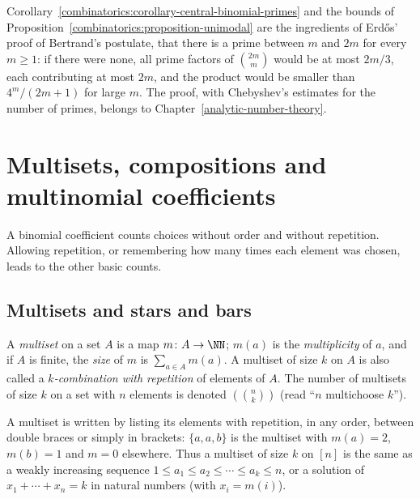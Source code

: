 \begin{remark}\label{combinatorics:remark-bertrand}
Corollary~\ref{combinatorics:corollary-central-binomial-primes} and the bounds of Proposition~\ref{combinatorics:proposition-unimodal} are the ingredients of Erd\H{o}s' proof of Bertrand's postulate,
that there is a prime between $m$ and $2m$ for every $m \geq 1$: if there were none, all prime factors of $\binom{2m}{m}$ would be at most $2m/3$, each contributing at most $2m$, and the product would
be smaller than $4^m/(2m + 1)$ for large $m$. The proof, with Chebyshev's estimates for the number of primes, belongs to Chapter~\ref{analytic-number-theory}.
\end{remark}

\section{Multisets, compositions and multinomial coefficients}\label{combinatorics:section-multisets}

A binomial coefficient counts choices without order and without repetition. Allowing repetition, or remembering how many times each element was chosen, leads to the other basic counts.

\subsection{Multisets and stars and bars}\label{combinatorics:subsection-stars-bars}

\begin{definition}\label{combinatorics:definition-multiset}
A \emph{multiset} on a set $A$ is a map $m \colon A \to \NN$; $m(a)$ is the \emph{multiplicity} of $a$, and if $A$ is finite, the \emph{size} of $m$ is $\sum_{a \in A}m(a)$. A multiset of size $k$
on $A$ is also called a \emph{$k$-combination with repetition} of elements of $A$. The number of multisets of size $k$ on a set with $n$ elements is denoted $\left(\!\binom{n}{k}\!\right)$
(read ``$n$ multichoose $k$'').
\end{definition}

\begin{notation}\label{combinatorics:notation-multiset}
A multiset is written by listing its elements with repetition, in any order, between double braces or simply in brackets: $\{a, a, b\}$ is the multiset with $m(a) = 2$, $m(b) = 1$ and $m = 0$
elsewhere. Thus a multiset of size $k$ on $[n]$ is the same as a weakly increasing sequence $1 \leq a_1 \leq a_2 \leq \cdots \leq a_k \leq n$, or a solution of $x_1 + \cdots + x_n = k$ in
natural numbers (with $x_i = m(i)$).
\end{notation}

